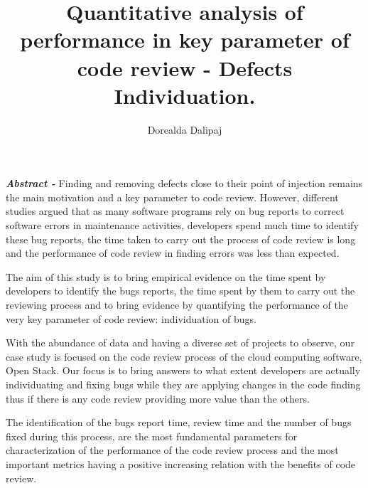 \documentclass[ifip]{svmult}
\begin{document}
\title*{Quantitative analysis of performance in key parameter of code review - Defects Individuation.}
\author{Dorealda Dalipaj}
%
%
\maketitle

\textbf{\textit{Abstract -}} Finding and removing defects close to their point of injection remains the main motivation and a key parameter
to code review. However, different studies argued that  as many 
software programs rely on bug reports to correct software errors in maintenance activities, 
developers spend much time to identify these bug reports, the time taken to carry out the process of 
code review is long and the performance of code review in finding errors was less than expected.

The aim of this study is to bring empirical evidence on the time spent by developers to identify the bugs reports, the time
spent by them to carry out the reviewing process and 
to bring evidence by quantifying the performance of the very key parameter of code review: 
individuation of bugs.

With the abundance of data and having a diverse set of projects to observe, our case study is focused on the code review process of the 
cloud computing software, Open Stack. Our focus is to bring answers to what extent developers are actually individuating and fixing bugs 
while they are applying changes in the code finding thus if there is any code review providing more value than the others. 

The identification of the bugs report time, review time and the number of bugs fixed during this process, are the most 
fundamental parameters for characterization of the performance of the code review process and the most important metrics having 
a positive increasing relation with the benefits of code review.


\end{document}
